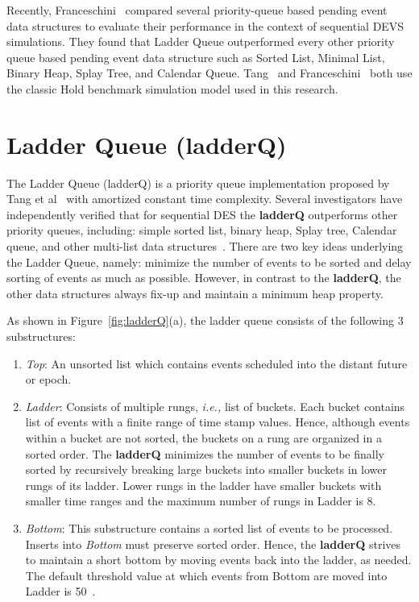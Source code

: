 Recently, Franceschini~\cite{franceschini-15} compared several
priority-queue based pending event data structures to evaluate their
performance in the context of sequential DEVS simulations. They found
that Ladder Queue outperformed every other priority queue based
pending event data structure such as Sorted List, Minimal List, Binary
Heap, Splay Tree, and Calendar Queue. Tang~\cite{tang-05} and
Franceschini~\cite{franceschini-15} both use the classic Hold
benchmark simulation model used in this research.

\section{Ladder Queue (ladderQ)} 

The Ladder Queue (ladderQ) is a priority queue implementation proposed
by Tang et al~\cite{tang-05} with amortized constant time complexity.
Several investigators have independently verified that for sequential
DES the \textbf{ladderQ} outperforms other priority queues, including:
simple sorted list, binary heap, Splay tree, Calendar queue, and other
multi-list data
structures~\cite{dickman-13,franceschini-15,tang-05}. There are two
key ideas underlying the Ladder Queue, namely: minimize the number of
events to be sorted and delay sorting of events as much as possible.
However, in contrast to the \textbf{ladderQ}, the other data
structures always fix-up and maintain a minimum heap property.

As shown in Figure~\ref{fig:ladderQ}(a), the ladder queue consists of
the following 3 substructures:

\begin{enumerate}[leftmargin=*,topsep=0pt]

\item \emph{Top}: An unsorted list which contains events scheduled
  into the distant future or epoch.

\item \emph{Ladder}: Consists of multiple rungs, \textit{i.e.,} list
  of buckets. Each bucket contains list of events with a finite range
  of time stamp values. Hence, although events within a bucket are not
  sorted, the buckets on a rung are organized in a sorted order. The
  \textbf{ladderQ} minimizes the number of events to be finally sorted
  by recursively breaking large buckets into smaller buckets in lower
  rungs of its ladder. Lower rungs in the ladder have smaller buckets
  with smaller time ranges and the maximum number of rungs in Ladder
  is 8.

\item \emph{Bottom}: This substructure contains a sorted list of
  events to be processed. Inserts into \emph{Bottom} must preserve
  sorted order. Hence, the \textbf{ladderQ} strives to maintain a
  short bottom by moving events back into the ladder, as needed. The
  default threshold value at which events from Bottom are moved into
  Ladder is 50~\cite{tang-05}.

\end{enumerate}

